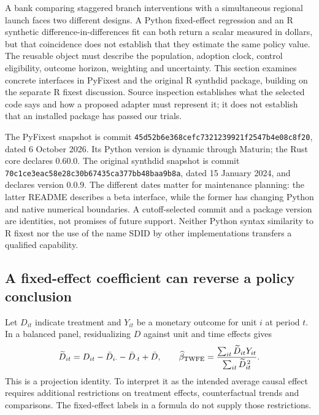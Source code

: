 A bank comparing staggered branch interventions with a simultaneous regional
launch faces two different designs. A Python fixed-effect regression and an R
synthetic difference-in-differences fit can both return a scalar measured in
dollars, but that coincidence does not establish that they estimate the same
policy value. The reusable object must describe the population, adoption clock,
control eligibility, outcome horizon, weighting and uncertainty. This section
examines concrete interfaces in PyFixest and the original R synthdid package,
building on the separate R fixest discussion. Source inspection establishes
what the selected code says and how a proposed adapter must represent it; it
does not establish that an installed package has passed our trials.
\citep{exec23_pyfixest_reuse_source,exec23_synthdid_reuse_source}

The PyFixest snapshot is commit
\texttt{45d52b6e368cefc7321239921f2547b4e08c8f20}, dated 6 October 2026.
Its Python version is dynamic through Maturin; the Rust core declares 0.60.0.
The original synthdid snapshot is commit
\texttt{70c1ce3eac58e28c30b67435ca377bb48baa9b8a}, dated 15 January 2024,
and declares version 0.0.9. The different dates matter for maintenance planning:
the latter README describes a beta interface, while the former has changing
Python and native numerical boundaries. A cutoff-selected commit and a package
version are identities, not promises of future support. Neither Python syntax
similarity to R fixest nor the use of the name SDID by other implementations
transfers a qualified capability.
\citep{exec23_pyfixest_reuse_source,exec23_synthdid_reuse_source}

\subsection{A fixed-effect coefficient can reverse a policy conclusion}
\label{exec23:panel-projection}
Let $D_{it}$ indicate treatment and $Y_{it}$ be a monetary outcome for unit $i$
at period $t$. In a balanced panel, residualizing $D$ against unit and time
effects gives
\begin{equation}
 \widetilde D_{it}=D_{it}-\bar D_{i\cdot}-\bar D_{\cdot t}+\bar D,
 \qquad
 \widehat\beta_{\rm TWFE}=
 \frac{\sum_{it}\widetilde D_{it}Y_{it}}
      {\sum_{it}\widetilde D_{it}^{\,2}}.
 \label{exec23:panel-twfe}
\end{equation}
This is a projection identity. To interpret it as the intended average causal
effect requires additional restrictions on treatment effects, counterfactual
trends and comparisons. The fixed-effect labels in a formula do not supply
those restrictions.

